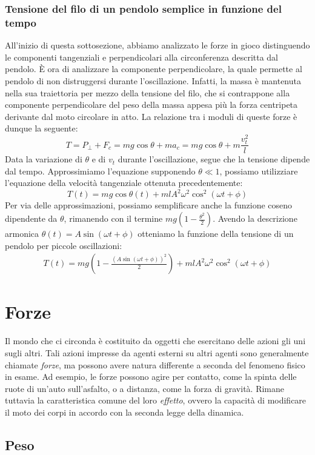 \subsubsection*{Tensione del filo di un pendolo semplice in funzione del tempo}
All'inizio di questa sottosezione, abbiamo analizzato le forze in gioco
distinguendo le componenti tangenziali e perpendicolari alla circonferenza
descritta dal pendolo. È ora di analizzare la componente perpendicolare,
la quale permette al pendolo di non distruggersi durante l'oscillazione.
Infatti, la massa è mantenuta nella sua traiettoria per mezzo della tensione
del filo, che si contrappone alla componente perpendicolare del peso della
massa appesa più la forza centripeta derivante dal moto circolare in atto.
La relazione tra i moduli di queste forze è dunque la seguente:
\[T = P_\perp + F_c = mg\cos\theta + ma_c = mg\cos\theta + m\frac{v_t^2}{l} \]
Data la variazione di $\theta$ e di $v_t$ durante l'oscillazione, segue
che la tensione dipende dal tempo. Approssimiamo l'equazione supponendo
$\theta\ll1$, possiamo utilizziare
l'equazione della velocità tangenziale ottenuta precedentemente:
\[ T(t) = mg\cos\theta(t) + mlA^2\omega^2\cos^2(\omega t + \phi) \]
Per via delle approssimazioni, possiamo semplificare anche la funzione coseno
dipendente da $\theta$, rimanendo con il termine $mg(1-\frac{\theta^2}{2})$. Avendo la
descrizione armonica $\theta(t) = A\sin(\omega t + \phi)$ otteniamo la funzione
della tensione di un pendolo per piccole oscillazioni:
\begin{align}
    T(t) = mg\left(1 - \frac{(A\sin(\omega t + \phi))^2}{2}\right) + mlA^2\omega^2\cos^2(\omega t + \phi)
\end{align}

\section{Forze}
Il mondo che ci circonda è costituito da oggetti che esercitano delle azioni gli
uni sugli altri. Tali azioni impresse da agenti esterni su altri agenti sono
generalmente chiamate \textit{forze}, ma possono avere natura differente a seconda
del fenomeno fisico in esame. Ad esempio, le forze possono agire per contatto, come
la spinta delle ruote di un'auto sull'asfalto, o a distanza, come la forza di gravità.
Rimane tuttavia la caratteristica comune del loro \textit{effetto}, ovvero la capacità
di modificare il moto dei corpi in accordo con la seconda legge della dinamica.

\subsection{Peso}

